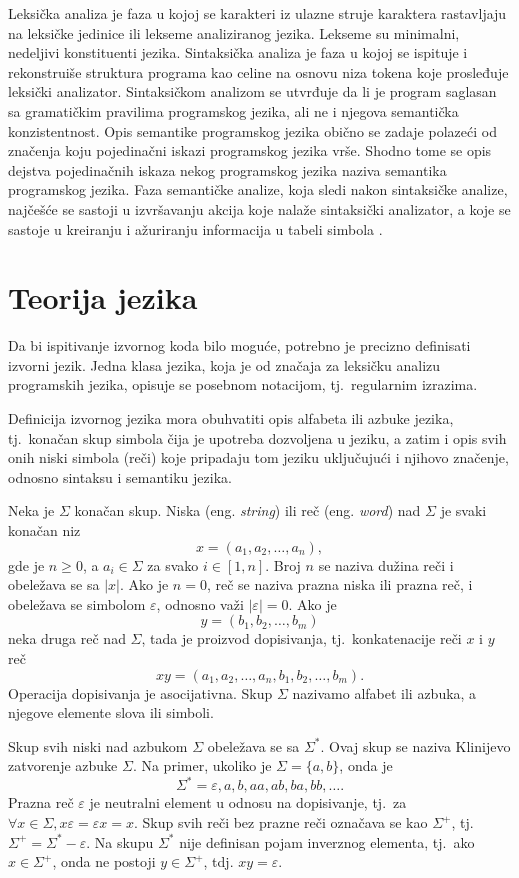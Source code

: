 \documentclass[12pt,oneside]{memoir}
\theoremstyle{plain}
\theoremstyle{definition}
\begin{document}
Leksička analiza je faza u kojoj se karakteri iz ulazne struje karaktera rastavljaju na leksičke jedinice ili lekseme analiziranog jezika. Lekseme su minimalni, nedeljivi konstituenti jezika. Sintaksička analiza je faza u kojoj se ispituje i rekonstruiše struktura programa kao celine na osnovu niza tokena koje prosleđuje leksički analizator. Sintaksičkom analizom se utvrđuje da li je program saglasan sa gramatičkim pravilima programskog jezika, ali ne i njegova semantička konzistentnost. Opis semantike programskog jezika obično se zadaje polazeći od značenja koju pojedinačni iskazi programskog jezika vrše. Shodno tome se opis dejstva pojedinačnih iskaza nekog programskog jezika naziva semantika programskog jezika. Faza semantičke analize, koja sledi nakon sintaksičke analize, najčešće se sastoji u izvršavanju akcija koje nalaže sintaksički analizator, a koje se sastoje u kreiranju i ažuriranju informacija u tabeli simbola \cite{Vitas}.

\section{Teorija jezika}
Da bi ispitivanje izvornog koda bilo moguće, potrebno je precizno definisati izvorni jezik. Jedna klasa jezika, koja je od značaja za leksičku analizu programskih jezika, opisuje se posebnom notacijom, tj.~regularnim izrazima.

Definicija izvornog jezika mora obuhvatiti opis alfabeta ili azbuke jezika, tj.~konačan skup simbola čija je upotreba dozvoljena u jeziku, a zatim i opis svih onih niski simbola (reči) koje pripadaju tom jeziku uključujući i njihovo značenje, odnosno sintaksu i semantiku jezika. 

Neka je $\Sigma$  konačan skup. Niska (eng. \textit{string}) ili reč (eng. \textit{word}) nad $\Sigma$ je svaki konačan niz $$x = (a_1, a_2, …, a_n),$$ gde je $n \geq 0$, a $a_i \in \Sigma$ za svako $\textit{i} \in [1,n]$. Broj $n$ se naziva dužina reči i obeležava se sa $|x|$. Ako je $n=0$, reč se naziva prazna niska ili prazna reč, i obeležava se simbolom $\varepsilon$, odnosno važi $| \varepsilon |=0$.  Ako je $$y = (b_1, b_2, …, b_m)$$ neka druga reč nad $\Sigma$, tada je proizvod dopisivanja, tj.~konkatenacije reči $x$ i $y$ reč $$xy =(a_1, a_2, …, a_n, b_1, b_2, …, b_m).$$
Operacija dopisivanja je asocijativna. Skup $\Sigma$ nazivamo alfabet ili azbuka, a njegove elemente slova ili simboli.

Skup svih niski nad azbukom $\Sigma$ obeležava se sa $\Sigma^*$. Ovaj skup se naziva Klinijevo zatvorenje azbuke $\Sigma$. Na primer, ukoliko je $\Sigma = \{a,b\}$, onda je $$\Sigma^* = { \varepsilon, a, b, aa, ab, ba, bb, …}.$$
Prazna reč $\varepsilon$ je neutralni element u odnosu na dopisivanje, tj.~za $\forall x\in \Sigma, x\varepsilon = \varepsilon x = x$. Skup svih reči bez prazne reči označava se kao $\Sigma^+$, tj.~$\Sigma^+ = \Sigma^* - { \varepsilon }$. Na skupu $\Sigma^*$ nije definisan pojam inverznog elementa, tj.~ako $x \in \Sigma^+$, onda ne postoji $y \in \Sigma^+$, tdj. $xy = \varepsilon$.
\end{document}

